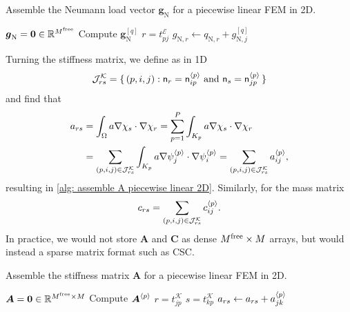 \begin{algorithm}
\caption{Assemble the Neumann load vector $\boldsymbol{g}_{\mathrm{N}}$ for a
piecewise linear FEM in 2D.}
\label{alg: assemble gN piecewise linear 2D}
\begin{algorithmic}
\State $\boldsymbol{g}_{\mathrm{N}}=\boldsymbol{0}\in\mathbb{R}^{M^{\mathrm{free}}}$
    \State Compute $\boldsymbol{g}_{\mathrm{N}}^{[q]}$
        \State $r=t^{\mathcal{E}}_{pj}$
            \State $g_{\mathrm{N},r}\gets
                    q_{\mathrm{N},r}+g^{[q]}_{\mathrm{N},j}$
        \EndIf
    \EndFor
\EndFor
\end{algorithmic}
\end{algorithm}


Turning the stiffness matrix, we define as in 1D
\[
\mathcal{J}^{\mathcal{K}}_{rs}=\{\,(p,i,j):
    \text{$\mathsf{n}_r=\mathsf{n}^{\langle p\rangle}_{ip}$ and
    $\mathsf{n}_s=\mathsf{n}^{\langle p\rangle}_{jp}$}\,\}
\]
and find that
\begin{align*}
a_{rs}&=\int_\Omega a\nabla\chi_s\cdot\nabla\chi_r
    =\sum_{p=1}^P\int_{K_p}a\nabla\chi_s\cdot\nabla\chi_r\\
    &=\sum_{(p,i,j)\in\mathcal{J}^{\mathcal{K}}_{rs}}
    \int_{K_p}a\nabla\psi^{\langle p\rangle}_j\cdot\nabla\psi^{\langle p\rangle}_i
    =\sum_{(p,i,j)\in\mathcal{J}^{\mathcal{K}}_{rs}}a^{\langle p\rangle}_{ij},
\end{align*}
resulting in \cref{alg: assemble A piecewise linear 2D}. Similarly, for the mass
matrix
\[
c_{rs}=\sum_{(p,i,j)\in\mathcal{J}^{\mathcal{K}}_{rs}}c^{\langle p\rangle}_{ij}.
\]
In practice, we would not store $\boldsymbol{A}$ and $\boldsymbol{C}$ as dense
$M^{\mathrm{free}}\times M$ arrays, but would instead a sparse matrix format such as CSC.

\begin{algorithm}
\caption{Assemble the stiffness matrix $\boldsymbol{A}$ for a piecewise linear
FEM in 2D.}
\label{alg: assemble A piecewise linear 2D}
\begin{algorithmic}
\State $\boldsymbol{A}=\boldsymbol{0}\in\mathbb{R}^{M^{\mathrm{free}}\times M}$
    \State Compute $\boldsymbol{A}^{\langle p\rangle}$
        \State $r=t^{\mathcal{K}}_{jp}$
                \State $s=t^{\mathcal{K}}_{kp}$
                \State $a_{rs}\gets a_{rs}+a^{\langle p\rangle}_{jk}$
            \EndFor
        \EndIf
    \EndFor
\EndFor
\end{algorithmic}
\end{algorithm}



